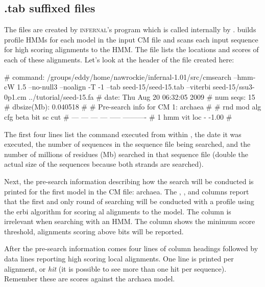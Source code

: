 \subsection{.tab suffixed files}

The  files are created by \textsc{infernal}'s
 program which is called internally by
.  builds profile HMMs for each model
in the input CM file and scans each input sequence for high scoring
alignments to the HMM\@. The  file lists the locations and
scores of each of these alignments. Let's look at the header of the 
 file created here:

\begin{sreoutput}
# command:    /groups/eddy/home/nawrockie/infernal-1.01/src/cmsearch --hmm-cW 1.5 --no-null3 
--noalign -T -1 --tab seed-15/seed-15.tab --viterbi seed-15/ssu3-0p1.cm ../tutorial/seed-15.fa
# date:       Thu Aug 20 06:32:05 2009
# num seqs:   15
# dbsize(Mb): 0.040518
#
# Pre-search info for CM 1: archaea
#
# rnd  mod  alg  cfg   beta  bit sc cut
# ---  ---  ---  ---  -----  ----------
#   1  hmm  vit  loc      -       -1.00
#
\end{sreoutput}

The first four lines list the  command executed from
within , the date it was executed, the number of
sequences in the sequence file being searched, and the number of
millions of residues (Mb) searched in that sequence file (double the
actual size of the sequences because both strands are searched).

Next, the pre-search information describing how the search will be
conducted is printed for the first model in the CM file: archaea. 
The , ,  and  columns report
that the first and only round of searching will be conducted with a
profile  using the erbi algorithm for scoring
al alignments to the model. The 
column is irrelevant when searching with an HMM\@. The 
column shows the minimum score threshold, alignments scoring above
 bits will be reported.

After the pre-search information comes four lines of column headings
followed by data lines reporting high scoring local alignments. One
line is printed per alignment, or \emph{hit} (it is possible to see
more than one hit per sequence). Remember these are scores against the
archaea model.


